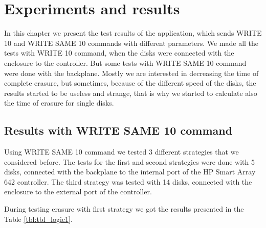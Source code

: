 \chapter{Experiments and results}
\label{chap5:title}

In this chapter we present the test results of the application, which sends WRITE 10 and WRITE SAME 10 commands with different parameters. We made all the tests with WRITE 10 command, when the disks were connected with the enclosure to the controller. But some tests with WRITE SAME 10 command were done with the backplane. Mostly we are interested in decreasing the time of complete erasure, but sometimes, because of the different speed of the disks, the results started to be useless and strange, that is why we started to calculate also the time of erasure for single disks. 

\section{Results with WRITE SAME 10 command}
Using WRITE SAME 10 command we tested 3 different strategies that we considered before. The tests for the first and second strategies were done with 5 disks, connected with the backplane to the internal port of the HP Smart Array 642 controller. The third strategy was tested with 14 disks, connected with the enclosure to the external port of the controller. 

\newpage 
During testing erasure with first strategy we got the results presented in the Table \ref{tbl:tbl_logic1}. 

